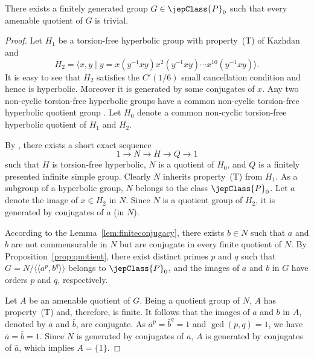 \begin{theorem}\label{thm:construction}
There exists a finitely generated group $G\in\jepClass{P}_0$ such that every amenable quotient of $G$ is trivial.
\end{theorem}
\begin{proof}
Let $H_1$ be a torsion-free hyperbolic group with property~(T) of Kazhdan and
\[
H_2=\langle x,y\mid y=x(y^{-1}xy)x^2(y^{-1}xy)\cdots x^{10}(y^{-1}xy)\rangle.
\]
It is easy to see that $H_2$ satisfies the $C'(1/6)$ small cancellation condition and hence is hyperbolic. Moreover it is generated by some conjugates of $x$. Any two non-cyclic
torsion-free hyperbolic groups have a common non-cyclic torsion-free hyperbolic quotient group \cite[Th.\,2]{ref15}. Let $H_0$ denote a common non-cyclic torsion-free hyperbolic quotient of $H_1$ and $H_2$.

By \cite[Cor.\,1.2]{ref01}, there exists a short exact sequence
\[
1\longrightarrow N\longrightarrow H\longrightarrow Q\longrightarrow1
\]
such that $H$ is torsion-free hyperbolic, $N$ is a quotient of $H_0$, and $Q$ is a finitely presented infinite simple group. Clearly $N$ inherits property~(T) from $H_1$. As a subgroup of a hyperbolic group, $N$ belongs to the class $\jepClass{P}_0$. Let $a$ denote the image of $x\in H_2$ in $N$. Since $N$ is a quotient group of $H_2$, it is generated by conjugates of $a$ (in $N$).

According to the Lemma~\ref{lem:finiteconjugacy}, there exists $b\in N$ such that $a$ and $b$ are not commensurable in $N$ but are conjugate in every finite quotient of $N$. By Proposition~\ref{prop:quotient}, there exist distinct primes $p$ and $q$ such that $G=N/\langle\!\langle a^p,b^q\rangle\!\rangle$ belongs to $\jepClass{P}_0$, and the images of $a$ and $b$ in $G$ have orders $p$ and $q$, respectively.

Let $A$ be an amenable quotient of $G$. Being a quotient group of $N$, $A$ has property~(T) and, therefore, is finite. It follows that the images of $a$ and $b$ in $A$, denoted by $\bar a$ and $\bar b$, are conjugate. As $\bar a^p=\bar b^{q}=1$ and $\gcd(p,q)=1$, we have $\bar a=\bar b=1$. Since $N$ is generated by conjugates of $a$, $A$ is generated by conjugates of $\bar a$, which implies $A=\{1\}$.
\end{proof}
